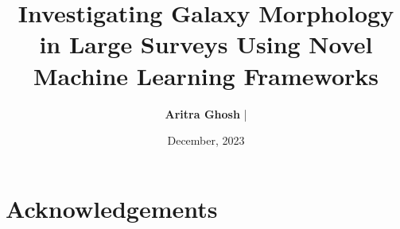 \documentclass[letterpaper,10pt]{yalephd}
\begin{document}
\title{Investigating Galaxy Morphology in Large Surveys Using Novel Machine Learning Frameworks} %
\author{\textbf{Aritra Ghosh} | }
\date{December, 2023} %

\frontmatter



\maketitle
{} %
\tableofcontents
\listoffigures %
\listoftables %

\chapter{Acknowledgements} %


\mainmatter



\begin{subappendices}
    
\end{subappendices}

\begin{subappendices}
    
\end{subappendices}

\begin{subappendices}
    
\end{subappendices}

\begin{subappendices}
     
\end{subappendices}


\backmatter



\end{document}
